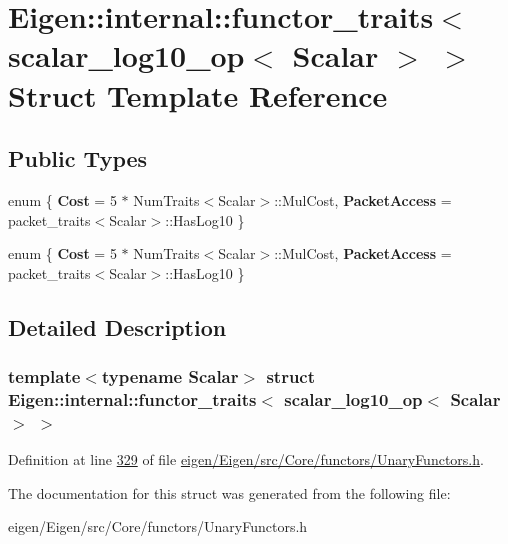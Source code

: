 \hypertarget{struct_eigen_1_1internal_1_1functor__traits_3_01scalar__log10__op_3_01_scalar_01_4_01_4}{}\section{Eigen\+:\+:internal\+:\+:functor\+\_\+traits$<$ scalar\+\_\+log10\+\_\+op$<$ Scalar $>$ $>$ Struct Template Reference}
\label{struct_eigen_1_1internal_1_1functor__traits_3_01scalar__log10__op_3_01_scalar_01_4_01_4}
\subsection*{Public Types}
\begin{DoxyCompactItemize}
\item 
\mbox{\label{struct_eigen_1_1internal_1_1functor__traits_3_01scalar__log10__op_3_01_scalar_01_4_01_4_a7e24d10e903e679063a7b513e1a1b844}} 
enum \{ {\bfseries Cost} = 5 $\ast$ Num\+Traits$<$Scalar$>$\+:\+:Mul\+Cost, 
{\bfseries Packet\+Access} = packet\+\_\+traits$<$Scalar$>$\+:\+:Has\+Log10
 \}
\item 
\mbox{\label{struct_eigen_1_1internal_1_1functor__traits_3_01scalar__log10__op_3_01_scalar_01_4_01_4_a660b955f9acfe08a4d54f22d43a7043d}} 
enum \{ {\bfseries Cost} = 5 $\ast$ Num\+Traits$<$Scalar$>$\+:\+:Mul\+Cost, 
{\bfseries Packet\+Access} = packet\+\_\+traits$<$Scalar$>$\+:\+:Has\+Log10
 \}
\end{DoxyCompactItemize}


\subsection{Detailed Description}
\subsubsection*{template$<$typename Scalar$>$\newline
struct Eigen\+::internal\+::functor\+\_\+traits$<$ scalar\+\_\+log10\+\_\+op$<$ Scalar $>$ $>$}



Definition at line \hyperlink{eigen_2_eigen_2src_2_core_2functors_2_unary_functors_8h_source_l00329}{329} of file \hyperlink{eigen_2_eigen_2src_2_core_2functors_2_unary_functors_8h_source}{eigen/\+Eigen/src/\+Core/functors/\+Unary\+Functors.\+h}.



The documentation for this struct was generated from the following file\+:\begin{DoxyCompactItemize}
\item 
eigen/\+Eigen/src/\+Core/functors/\+Unary\+Functors.\+h\end{DoxyCompactItemize}

